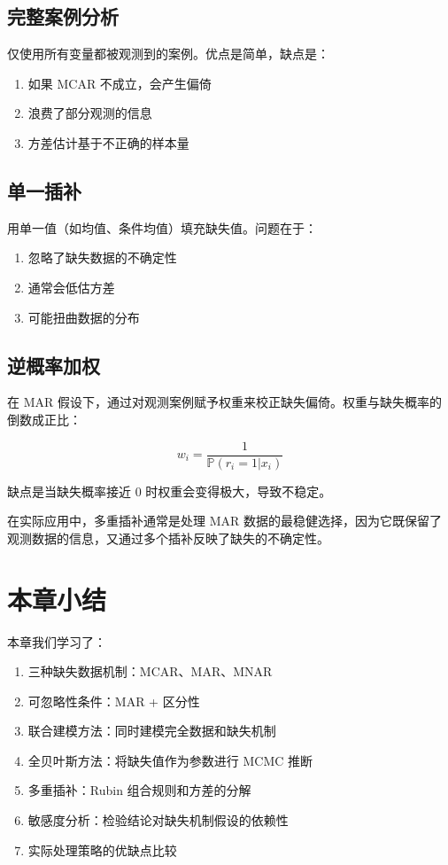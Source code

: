 \subsection{完整案例分析}

仅使用所有变量都被观测到的案例。优点是简单，缺点是：

\begin{enumerate}
  \item 如果 MCAR 不成立，会产生偏倚
  \item 浪费了部分观测的信息
  \item 方差估计基于不正确的样本量
\end{enumerate}

\subsection{单一插补}

用单一值（如均值、条件均值）填充缺失值。问题在于：

\begin{enumerate}
  \item 忽略了缺失数据的不确定性
  \item 通常会低估方差
  \item 可能扭曲数据的分布
\end{enumerate}

\subsection{逆概率加权}

在 MAR 假设下，通过对观测案例赋予权重来校正缺失偏倚。权重与缺失概率的倒数成正比：

\[
w_i = \frac{1}{\mathbb{P}(r_i = 1 | x_i)}
\label{eq:inverse-probability-weight}
\]

缺点是当缺失概率接近 0 时权重会变得极大，导致不稳定。

\begin{Remark}
  在实际应用中，多重插补通常是处理 MAR 数据的最稳健选择，因为它既保留了观测数据的信息，又通过多个插补反映了缺失的不确定性。
\end{Remark}

\section{本章小结}

本章我们学习了：

\begin{enumerate}
  \item 三种缺失数据机制：MCAR、MAR、MNAR \cite{Rubin1976}
  \item 可忽略性条件：MAR + 区分性
  \item 联合建模方法：同时建模完全数据和缺失机制
  \item 全贝叶斯方法：将缺失值作为参数进行 MCMC 推断
  \item 多重插补：Rubin 组合规则和方差的分解
  \item 敏感度分析：检验结论对缺失机制假设的依赖性
  \item 实际处理策略的优缺点比较
\end{enumerate}

